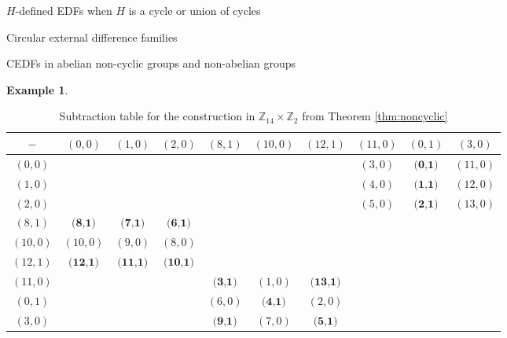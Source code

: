 \documentclass[12pt, a4paper]{article}
\theoremstyle{definition}
\newtheorem{example}[theorem]{Example}
\begin{document}
\begin{section}{$H$-defined EDFs when $H$ is a cycle or union of cycles}
\begin{subsection}{Circular external difference families}
\begin{subsection}{CEDFs in abelian non-cyclic groups and non-abelian groups}
\begin{example}
\begin{table}[h]
\renewcommand{\arraystretch}{1.2}
\centering
\setlength\tabcolsep{3pt}
\begin{tabular}{|c|ccc|ccc|ccc|} 
\hline
$-$ & $(0,0)$ & $(1,0)$ & $(2,0)$ & $(8,1)$ & $(10,0)$ & $(12,1)$ & $(11,0)$ & $(0,1)$ & $(3,0)$\\ \hline
$(0,0)$ &  &  &  &  & &  & $(3,0)$ & $\textbf{(0,1)}$ & $(11,0)$	\\
$(1,0)$  &  &  &  &  & &  & $(4,0)$ & $\textbf{(1,1)}$ & $(12,0)$	\\
$(2,0)$  &  &  &  &  & &  & $(5,0)$ & $\textbf{(2,1)}$ & $(13,0)$	\\
\hline
$(8,1)$ & $\textbf{(8,1)}$  & $\textbf{(7,1)}$ & $\textbf{(6,1)}$ &  & &  &  & & 	\\
$(10,0)$ & $(10,0)$  & $(9,0)$ & $(8,0)$ &  & &  &  & & 	\\
$(12,1)$ & $\textbf{(12,1)}$  & $\textbf{(11,1)}$ & $\textbf{(10,1)}$ &  & &  &  & & 	\\
\hline
$(11,0)$ &  &  &  & $\textbf{(3,1)}$ & $(1,0)$ & $\textbf{(13,1)}$	& & & \\
$(0,1)$  &  &  &  & $(6,0)$ & $\textbf{(4,1)}$ & $(2,0)$	& & & \\
$(3,0)$  &  &  &  & $\textbf{(9,1)}$ & $(7,0)$ & $\textbf{(5,1)}$	& & & \\
\hline
\end{tabular}
	
\caption{Subtraction table for the construction in $\mathbb{Z}_{14} \times \mathbb{Z}_2$ from Theorem \ref{thm:noncyclic}}
\label{table_noncyc_28}
\end{table}



\end{example}
\end{subsection}
\end{subsection}
\end{section}
\end{document}
